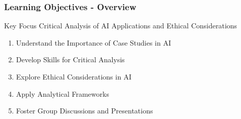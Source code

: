 \documentclass{beamer}
\begin{document}
\begin{frame}[fragile]
    \frametitle{Learning Objectives - Overview}
    \begin{block}{Key Focus}
        Critical Analysis of AI Applications and Ethical Considerations
    \end{block}
    \begin{enumerate}
        \item Understand the Importance of Case Studies in AI
        \item Develop Skills for Critical Analysis
        \item Explore Ethical Considerations in AI
        \item Apply Analytical Frameworks
        \item Foster Group Discussions and Presentations
    \end{enumerate}
\end{frame}
\end{document}
